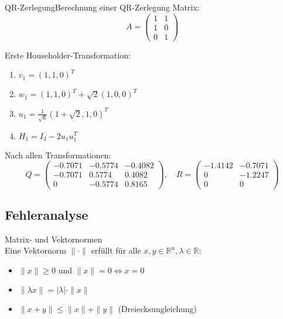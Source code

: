 \begin{example2}{QR-Zerlegung}{Berechnung einer QR-Zerlegung}
Matrix:
$$A = \begin{pmatrix}
1 & 1\\
1 & 0\\
0 & 1
\end{pmatrix}$$

Erste Householder-Transformation:
\begin{enumerate}
    \item $v_1 = (1,1,0)^T$
    \item $w_1 = (1,1,0)^T + \sqrt{2}(1,0,0)^T$
    \item $u_1 = \frac{1}{\sqrt{6}}(1+\sqrt{2},1,0)^T$
    \item $H_1 = I_3 - 2u_1u_1^T$
\end{enumerate}

Nach allen Transformationen:
$$Q = \begin{pmatrix}
-0.7071 & -0.5774 & -0.4082\\
-0.7071 & 0.5774 & 0.4082\\
0 & -0.5774 & 0.8165
\end{pmatrix}, \quad
R = \begin{pmatrix}
-1.4142 & -0.7071\\
0 & -1.2247\\
0 & 0
\end{pmatrix}$$
\end{example2}

\subsection{Fehleranalyse}

\begin{definition}{Matrix- und Vektornormen}\\
Eine Vektornorm $\|\cdot\|$ erfüllt für alle $x,y \in \mathbb{R}^n, \lambda \in \mathbb{R}$:
\begin{itemize}
    \item $\|x\| \geq 0$ und $\|x\| = 0 \Leftrightarrow x = 0$
    \item $\|\lambda x\| = |\lambda| \cdot \|x\|$
    \item $\|x + y\| \leq \|x\| + \|y\|$ (Dreiecksungleichung)
\end{itemize}
\end{definition}

